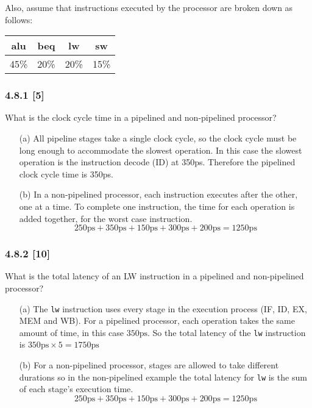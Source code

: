 \documentclass[fleqn]{article}
\begin{document}
Also, assume that instructions executed by the processor are broken down as follows:
\begin{table}[H]
    \centering
    \begin{tabular}{|c|c|c|c|}
    \hline
    \rowcolor[HTML]{1391DB} 
    alu & beq & lw & sw  \\ \hline \hline
    45\% & 20\% & 20\% & 15\% \\ \hline
    \end{tabular}
\end{table}
\subsubsection*{4.8.1 [5] \textrangle} What is the clock cycle time in a pipelined and non-pipelined processor?
\begin{itemize}
    \item[(a)] All pipeline stages take a single clock cycle, so the clock cycle must be long enough to accommodate the slowest operation. In this case the slowest operation is the instruction decode (ID) at 350ps. Therefore the pipelined clock cycle time is 350ps.
    \item[(b)] In a non-pipelined processor, each instruction executes after the other, one at a time. To complete one instruction, the time for each operation is added together, for the worst case instruction. \[250\text{ps} + 350\text{ps} + 150\text{ps} + 300\text{ps} + 200\text{ps} = 1250\text{ps}\] 
\end{itemize}

\subsubsection*{4.8.2 [10] \textrangle} What is the total latency of an LW instruction in a pipelined and non-pipelined processor?
\begin{itemize}
    \item[(a)] The \verb|lw| instruction uses every stage in the execution process (IF, ID, EX, MEM and WB). For a pipelined processor, each operation takes the same amount of time, in this case $350\text{ps}$. So the total latency of the \verb|lw| instruction is $350\text{ps} \times 5 = 1750\text{ps}$
    \item[(b)] For a non-pipelined processor, stages are allowed to take different durations so in the non-pipelined example the total latency for \verb|lw| is the sum of each stage's execution time.  \[250\text{ps} + 350\text{ps} + 150\text{ps} + 300\text{ps} + 200\text{ps} = 1250\text{ps}\] 
\end{itemize}
\vspace{0.125in}
\end{document}
